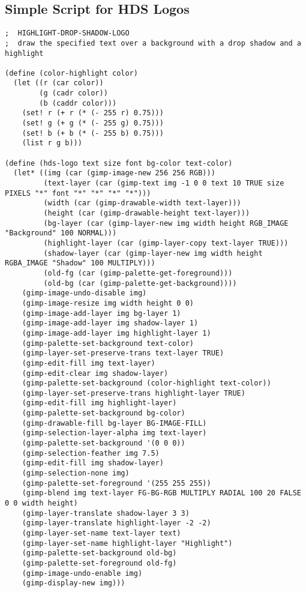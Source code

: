 \documentclass{article}
\begin{document}
\subsection{Simple Script for HDS Logos}
{\scriptsize
\begin{verbatim}
;  HIGHLIGHT-DROP-SHADOW-LOGO
;  draw the specified text over a background with a drop shadow and a highlight

(define (color-highlight color)
  (let ((r (car color))
        (g (cadr color))
        (b (caddr color)))
    (set! r (+ r (* (- 255 r) 0.75)))
    (set! g (+ g (* (- 255 g) 0.75)))
    (set! b (+ b (* (- 255 b) 0.75)))
    (list r g b)))

(define (hds-logo text size font bg-color text-color)
  (let* ((img (car (gimp-image-new 256 256 RGB)))
         (text-layer (car (gimp-text img -1 0 0 text 10 TRUE size PIXELS "*" font "*" "*" "*" "*")))
         (width (car (gimp-drawable-width text-layer)))
         (height (car (gimp-drawable-height text-layer)))
         (bg-layer (car (gimp-layer-new img width height RGB_IMAGE "Background" 100 NORMAL)))
         (highlight-layer (car (gimp-layer-copy text-layer TRUE)))
         (shadow-layer (car (gimp-layer-new img width height RGBA_IMAGE "Shadow" 100 MULTIPLY)))
         (old-fg (car (gimp-palette-get-foreground)))
         (old-bg (car (gimp-palette-get-background))))
    (gimp-image-undo-disable img)
    (gimp-image-resize img width height 0 0)
    (gimp-image-add-layer img bg-layer 1)
    (gimp-image-add-layer img shadow-layer 1)
    (gimp-image-add-layer img highlight-layer 1)
    (gimp-palette-set-background text-color)
    (gimp-layer-set-preserve-trans text-layer TRUE)
    (gimp-edit-fill img text-layer)
    (gimp-edit-clear img shadow-layer)
    (gimp-palette-set-background (color-highlight text-color))
    (gimp-layer-set-preserve-trans highlight-layer TRUE)
    (gimp-edit-fill img highlight-layer)
    (gimp-palette-set-background bg-color)
    (gimp-drawable-fill bg-layer BG-IMAGE-FILL)
    (gimp-selection-layer-alpha img text-layer)
    (gimp-palette-set-background '(0 0 0))
    (gimp-selection-feather img 7.5)
    (gimp-edit-fill img shadow-layer)
    (gimp-selection-none img)
    (gimp-palette-set-foreground '(255 255 255))
    (gimp-blend img text-layer FG-BG-RGB MULTIPLY RADIAL 100 20 FALSE 0 0 width height)
    (gimp-layer-translate shadow-layer 3 3)
    (gimp-layer-translate highlight-layer -2 -2)
    (gimp-layer-set-name text-layer text)
    (gimp-layer-set-name highlight-layer "Highlight")
    (gimp-palette-set-background old-bg)
    (gimp-palette-set-foreground old-fg)
    (gimp-image-undo-enable img)
    (gimp-display-new img)))
\end{verbatim}}
\end{document}
